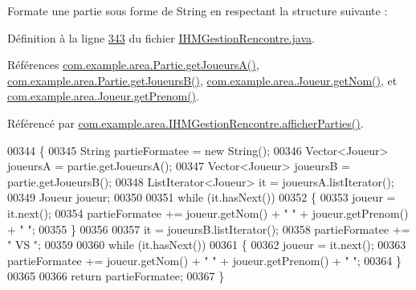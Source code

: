 Formate une partie sous forme de String en respectant la structure suivante \+: 



Définition à la ligne \hyperlink{_i_h_m_gestion_rencontre_8java_source_l00343}{343} du fichier \hyperlink{_i_h_m_gestion_rencontre_8java_source}{I\+H\+M\+Gestion\+Rencontre.\+java}.



Références \hyperlink{_partie_8java_source_l00064}{com.\+example.\+area.\+Partie.\+get\+Joueurs\+A()}, \hyperlink{_partie_8java_source_l00072}{com.\+example.\+area.\+Partie.\+get\+Joueurs\+B()}, \hyperlink{_joueur_8java_source_l00039}{com.\+example.\+area.\+Joueur.\+get\+Nom()}, et \hyperlink{_joueur_8java_source_l00047}{com.\+example.\+area.\+Joueur.\+get\+Prenom()}.



Référencé par \hyperlink{_i_h_m_gestion_rencontre_8java_source_l00322}{com.\+example.\+area.\+I\+H\+M\+Gestion\+Rencontre.\+afficher\+Parties()}.


\begin{DoxyCode}
00344     \{
00345         String partieFormatee = \textcolor{keyword}{new} String();
00346         Vector<Joueur> joueursA = partie.getJoueursA();
00347         Vector<Joueur> joueursB = partie.getJoueursB();
00348         ListIterator<Joueur> it = joueursA.listIterator();
00349         Joueur joueur;
00350 
00351         \textcolor{keywordflow}{while} (it.hasNext())
00352         \{
00353             joueur = it.next();
00354             partieFormatee += joueur.getNom() + \textcolor{stringliteral}{" "} + joueur.getPrenom() + \textcolor{stringliteral}{" "};
00355         \}
00356 
00357         it = joueursB.listIterator();
00358         partieFormatee += \textcolor{stringliteral}{" VS  "};
00359 
00360         \textcolor{keywordflow}{while} (it.hasNext())
00361         \{
00362             joueur = it.next();
00363             partieFormatee += joueur.getNom() + \textcolor{stringliteral}{" "} + joueur.getPrenom() + \textcolor{stringliteral}{" "};
00364         \}
00365 
00366         \textcolor{keywordflow}{return} partieFormatee;
00367     \}
\end{DoxyCode}
\mbox{\label{classcom_1_1example_1_1area_1_1_i_h_m_gestion_rencontre_aedaadbb550aab497aac0501ced04a3eb}} 
